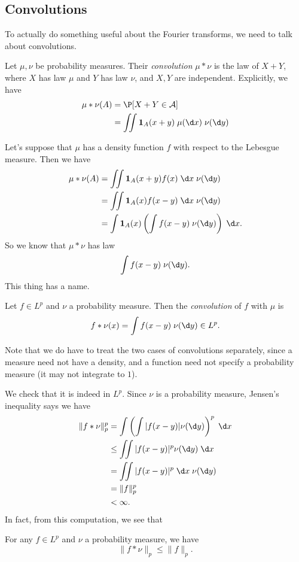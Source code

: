\documentclass[a4paper]{article}
\begin{document}
\subsection{Convolutions}
To actually do something useful about the Fourier transforms, we need to talk about convolutions.

\begin{defi}
  Let $\mu, \nu$ be probability measures. Their \emph{convolution} $\mu * \nu$ is the law of $X + Y$, where $X$ has law $\mu$ and $Y$ has law $\nu$, and $X, Y$ are independent. Explicitly, we have
  \begin{align*}
    \mu * \nu (A) &= \P[X + Y \in \mathcal{A}] \\
    &= \iint \mathbf{1}_{A}(x + y)\;\mu(\d x)\;\nu(\d y)
  \end{align*}
\end{defi}
Let's suppose that $\mu$ has a density function $f$ with respect to the Lebesgue measure. Then we have
\begin{align*}
  \mu * \nu(A) &= \iint \mathbf{1}_A(x + y) f(x) \;\d x\;\nu(\d y)\\
  &= \iint \mathbf{1}_A(x) f(x - y) \;\d x\;\nu(\d y)\\
  &= \int \mathbf{1}_A(x) \left(\int f(x - y)\;\nu (\d y)\right)\;\d x.
\end{align*}
So we know that $\mu * \nu$ has law
\[
  \int f(x - y)\;\nu (\d y).
\]
This thing has a name.
\begin{defi}
  Let $f \in L^p$ and $\nu$ a probability measure. Then the \emph{convolution} of $f$ with $\mu$ is
  \[
    f * \nu(x) = \int f(x - y)\;\nu(\d y) \in L^p.
  \]
\end{defi}
Note that we do have to treat the two cases of convolutions separately, since a measure need not have a density, and a function need not specify a probability measure (it may not integrate to $1$).

We check that it is indeed in $L^p$. Since $\nu$ is a probability measure, Jensen's inequality says we have
\begin{align*}
  \|f * \nu\|_p^p &= \int \left(\int |f(x - y)| \nu(\d y)\right)^p \;\d x\\
  &\leq \iint |f(x - y)|^p \nu(\d y)\;\d x\\
  &= \iint |f(x - y)|^p \;\d x \;\nu (\d y)\\
  &= \|f\|_p^p \\
  &< \infty.
\end{align*}
In fact, from this computation, we see that
\begin{prop}
  For any $f \in L^p$ and $\nu$ a probability measure, we have
  \[
    \|f * \nu\|_p \leq \|f\|_p.
  \]
\end{prop}
\end{document}
